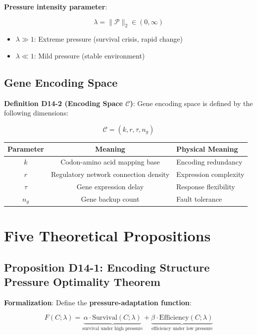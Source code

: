 \documentclass[12pt,a4paper]{article}
\newcommand{\calP}{\mathcal{P}}
\newcommand{\calC}{\mathcal{C}}
\newcommand{\calSsurv}{\text{Survival}}
\newcommand{\calEff}{\text{Efficiency}}
\begin{document}
\textbf{Pressure intensity parameter}:

$$\lambda = \|\calP\|_2 \in (0, \infty)$$

\begin{itemize}
    \item \textbf{$\lambda \gg 1$}: Extreme pressure (survival crisis, rapid change)
    \item \textbf{$\lambda \ll 1$}: Mild pressure (stable environment)
\end{itemize}

\subsection{Gene Encoding Space}

\textbf{Definition D14-2 (Encoding Space $\calC$)}: Gene encoding space is defined by the following dimensions:

$$\calC = (k, r, \tau, n_g)$$

\begin{center}
\begin{tabular}{c c l}
\toprule
\textbf{Parameter} & \textbf{Meaning} & \textbf{Physical Meaning} \\
\midrule
$k$ & Codon-amino acid mapping base & Encoding redundancy \\
$r$ & Regulatory network connection density & Expression complexity \\
$\tau$ & Gene expression delay & Response flexibility \\
$n_g$ & Gene backup count & Fault tolerance \\
\bottomrule
\end{tabular}
\end{center}

\section{Five Theoretical Propositions}

\subsection{Proposition D14-1: Encoding Structure Pressure Optimality Theorem}

\textbf{Formalization}: Define the \textbf{pressure-adaptation function}:

$$F(C; \lambda) = \underbrace{\alpha \cdot \calSsurv(C; \lambda)}_{\text{survival under high pressure}} + \underbrace{\beta \cdot \calEff(C; \lambda)}_{\text{efficiency under low pressure}}$$
\end{document}
